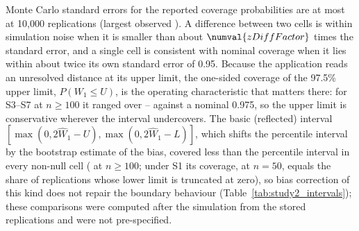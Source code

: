 Monte Carlo standard errors for the reported coverage probabilities are at most  at 10{,}000 replications (largest observed ). A difference between two cells is within simulation noise when it is smaller than about $\numval{zDiffFactor}$ times the standard error, and a single cell is consistent with nominal coverage when it lies within about twice its own standard error of 0.95. Because the application reads an unresolved distance at its upper limit, the one-sided coverage of the 97.5\% upper limit, $P(W_1 \leq U)$, is the operating characteristic that matters there: for S3--S7 at $n \geq 100$ it ranged over -- against a nominal 0.975, so the upper limit is conservative wherever the interval undercovers. The basic (reflected) interval $[\max(0, 2\widehat{W}_1 - U), \max(0, 2\widehat{W}_1 - L)]$, which shifts the percentile interval by the bootstrap estimate of the bias, covered less than the percentile interval in every non-null cell ( at $n \geq 100$; under S1 its coverage,  at $n = 50$, equals the share of replications whose lower limit is truncated at zero), so bias correction of this kind does not repair the boundary behaviour (Table~\ref{tab:study2_intervals}); these comparisons were computed after the simulation from the stored replications and were not pre-specified.

